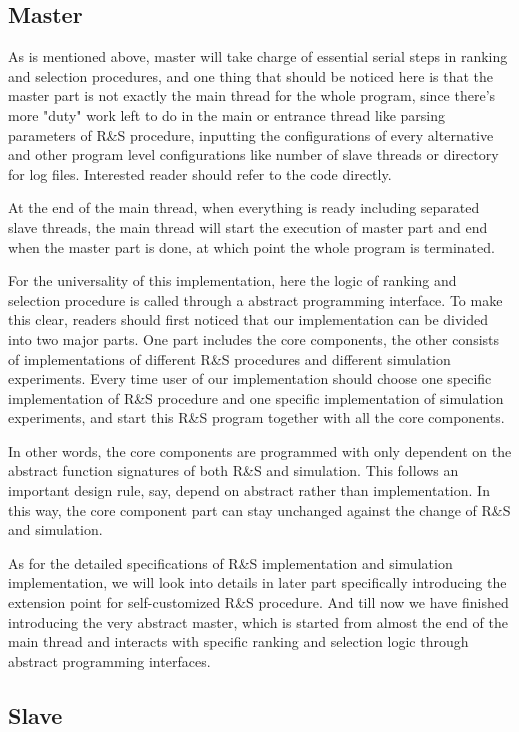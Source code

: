 \documentclass[12pt,a4]{report}
\begin{document}
\subsection{Master}

As is mentioned above, master will take charge of essential serial steps in ranking and selection procedures, and one thing that should be noticed here is that the master part is not exactly the main thread for the whole program, since there's more "duty" work left to do in the main or entrance thread like parsing parameters of R\&S procedure, inputting the configurations of every alternative and other program level configurations like number of slave threads or directory for log files. Interested reader should refer to the code directly.

At the end of the main thread, when everything is ready including separated slave threads, the main thread will start the execution of master part and end when the master part is done, at which point the whole program is terminated.

For the universality of this implementation, here the logic of ranking and selection procedure is called through a abstract programming interface. To make this clear, readers should first noticed that our implementation can be divided into two major parts. One part includes the core components, the other consists of implementations of different R\&S procedures and different simulation experiments. Every time user of our implementation should choose one specific implementation of R\&S procedure and one specific implementation of simulation experiments, and start this R\&S program together with all the core components.

In other words, the core components are programmed with only dependent on the abstract function signatures of both R\&S and simulation. This follows an important design rule, say, depend on abstract rather than implementation. In this way, the core component part can stay unchanged against the change of R\&S and simulation.

As for the detailed specifications of R\&S implementation and simulation implementation, we will look into details in later part specifically introducing the extension point for self-customized R\&S procedure. And till now we have finished introducing the very abstract master, which is started from almost the end of the main thread and interacts with specific ranking and selection logic through abstract programming interfaces.

\subsection{Slave}
\end{document}
